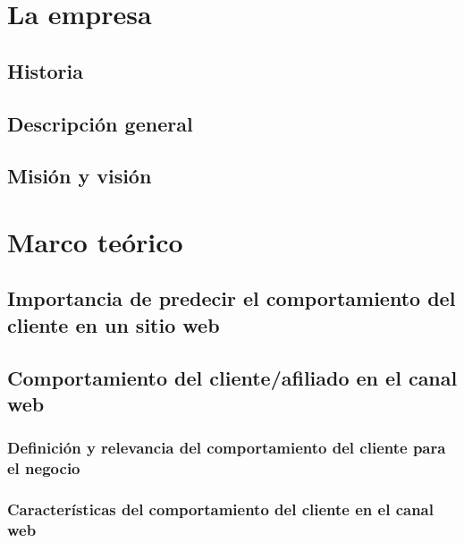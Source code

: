 \documentclass{report}
\begin{document}
\chapter{La empresa}

\section{Historia}


\section{Descripción general}


\section{Misión y visión}


\chapter{Marco teórico}

\section{Importancia de predecir el comportamiento del cliente en un sitio web}


\section{Comportamiento del cliente/afiliado en el canal web}

\subsection{Definición y relevancia del comportamiento del cliente para el negocio}


\subsection{Características del comportamiento del cliente en el canal web}

\end{document}
